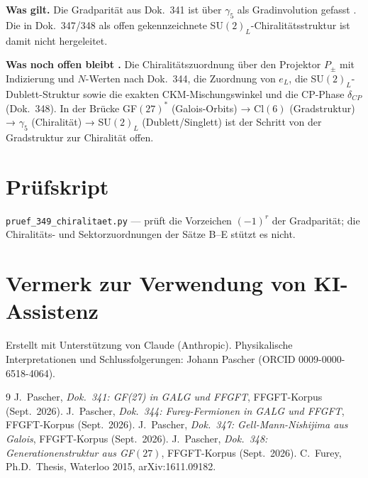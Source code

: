 \textbf{Was gilt.} Die Gradparität aus Dok.~341 ist über $\gamma_5$ als
Gradinvolution gefasst \BM. Die in Dok.~347/348 als offen gekennzeichnete
SU$(2)_L$-Chiralitätsstruktur ist damit nicht hergeleitet.

\textbf{Was noch offen bleibt \SM.} Die Chiralitätszuordnung über den
Projektor $P_\pm$ mit Indizierung und $N$-Werten nach Dok.~344, die
Zuordnung von $e_L$, die SU$(2)_L$-Dublett-Struktur sowie die exakten
CKM-Mischungswinkel und die CP-Phase $\delta_{CP}$ (Dok.~348). In der Brücke
GF$(27)^*$ (Galois-Orbits) → Cl$(6)$ (Gradstruktur) → $\gamma_5$ (Chiralität)
→ SU$(2)_L$ (Dublett/Singlett) ist der Schritt von der Gradstruktur zur
Chiralität offen.

\section*{Prüfskript}
\texttt{pruef\_349\_chiralitaet.py} --- prüft die Vorzeichen $(-1)^r$ der Gradparität; die Chiralitäts- und Sektorzuordnungen der Sätze B--E stützt es nicht.

\section*{Vermerk zur Verwendung von KI-Assistenz}
Erstellt mit Unterstützung von Claude (Anthropic).
Physikalische Interpretationen und Schlussfolgerungen:
Johann Pascher (ORCID 0009-0000-6518-4064).

\begin{thebibliography}{9}
 J.~Pascher, \textit{Dok.~341: GF(27) in GALG und FFGFT}, FFGFT-Korpus (Sept.\ 2026).
 J.~Pascher, \textit{Dok.~344: Furey-Fermionen in GALG und FFGFT}, FFGFT-Korpus (Sept.\ 2026).
 J.~Pascher, \textit{Dok.~347: Gell-Mann-Nishijima aus Galois}, FFGFT-Korpus (Sept.\ 2026).
 J.~Pascher, \textit{Dok.~348: Generationenstruktur aus GF$(27)$}, FFGFT-Korpus (Sept.\ 2026).
 C.~Furey, Ph.D.\ Thesis, Waterloo 2015, arXiv:1611.09182.
\end{thebibliography}

